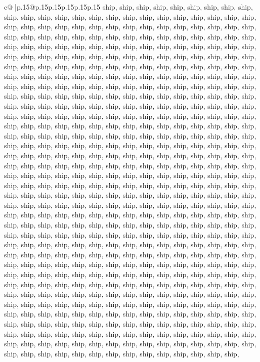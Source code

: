 \documentclass{article}
\begin{document}
{\begin{supertabular}{c@{$\;$}|p{.15\linewidth}@{}p{.15\linewidth}p{.15\linewidth}p{.15\linewidth}p{.15\linewidth}p{.15\linewidth}}
{{{ship, ship, ship, ship, ship, ship, ship, ship, ship, ship, ship, ship, ship, ship, ship, ship, ship, ship, ship, ship, ship, ship, ship, ship, ship, ship, ship, ship, ship, ship, ship, ship, ship, ship, ship, ship, ship, ship, ship, ship, ship, ship, ship, ship, ship, ship, ship, ship, ship, ship, ship, ship, ship, ship, ship, ship, ship, ship, ship, ship, ship, ship, ship, ship, ship, ship, ship, ship, ship, ship, ship, ship, ship, ship, ship, ship, ship, ship, ship, ship, ship, ship, ship, ship, ship, ship, ship, ship, ship, ship, ship, ship, ship, ship, ship, ship, ship, ship, ship, ship, ship, ship, ship, ship, ship, ship, ship, ship, ship, ship, ship, ship, ship, ship, ship, ship, ship, ship, ship, ship, ship, ship, ship, ship, ship, ship, ship, ship, ship, ship, ship, ship, ship, ship, ship, ship, ship, ship, ship, ship, ship, ship, ship, ship, ship, ship, ship, ship, ship, ship, ship, ship, ship, ship, ship, ship, ship, ship, ship, ship, ship, ship, ship, ship, ship, ship, ship, ship, ship, ship, ship, ship, ship, ship, ship, ship, ship, ship, ship, ship, ship, ship, ship, ship, ship, ship, ship, ship, ship, ship, ship, ship, ship, ship, ship, ship, ship, ship, ship, ship, ship, ship, ship, ship, ship, ship, ship, ship, ship, ship, ship, ship, ship, ship, ship, ship, ship, ship, ship, ship, ship, ship, ship, ship, ship, ship, ship, ship, ship, ship, ship, ship, ship, ship, ship, ship, ship, ship, ship, ship, ship, ship, ship, ship, ship, ship, ship, ship, ship, ship, ship, ship, ship, ship, ship, ship, ship, ship, ship, ship, ship, ship, ship, ship, ship, ship, ship, ship, ship, ship, ship, ship, ship, ship, ship, ship, ship, ship, ship, ship, ship, ship, ship, ship, ship, ship, ship, ship, ship, ship, ship, ship, ship, ship, ship, ship, ship, ship, ship, ship, ship, ship, ship, ship, ship, ship, ship, ship, ship, ship, ship, ship, ship, ship, ship, ship, ship, ship, ship, ship, ship, ship, ship, ship, ship, ship, ship, ship, ship, ship, ship, ship, ship, ship, ship, ship, ship, ship, ship, ship, ship, ship, ship, ship, ship, ship, ship, ship, ship, ship, ship, ship, ship, ship, ship, ship, ship, ship, ship, ship, ship, ship, ship, ship, ship, ship, ship, ship, ship, ship, ship, ship, ship, ship, ship, ship, ship, ship, ship, ship, ship, ship, ship, ship, ship, ship, ship, ship, ship, ship, ship, ship, ship, ship, ship, ship, ship, ship, ship, ship, ship, ship, ship, ship, ship, ship, ship, ship, ship, ship, ship, ship, ship, ship, ship, ship, ship, ship, ship, ship, ship, ship, ship, ship, ship, ship, ship, ship, ship, ship, ship, ship, ship, ship, ship, ship, ship, ship, ship, ship, ship, ship, ship, ship, ship, ship, ship, ship, ship, ship, ship, ship, ship, ship, ship, ship, ship, ship, ship, ship, ship, ship, ship, ship, ship, ship, ship, ship, ship, ship, ship, ship, ship, ship, ship, ship, ship, ship, ship, ship, ship, ship, ship, ship, ship, ship, ship, ship, ship, ship, ship, ship, ship, ship, ship, ship, ship, ship, ship, ship, ship, ship, ship, ship, ship, ship, ship, ship, ship, ship, ship, ship, ship, ship, ship, ship, ship, ship, ship, ship, ship, ship, ship, ship, ship, ship, ship, ship, ship, ship, ship, ship, ship, }}}
\end{supertabular}}
\end{document}
